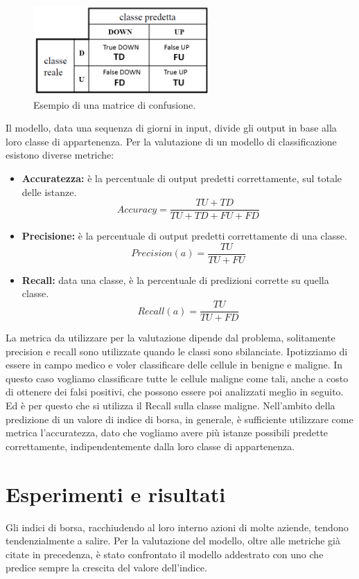 \documentclass[12pt,a4paper,twoside,openright]{book}
\begin{document}
\begin{figure}[H]
\centering
\includegraphics[width=0.6\textwidth]{images/cm2.png}
\caption{Esempio di una matrice di confusione.}
\label{fig:rapp_file}
\end{figure}

Il modello, data una sequenza di giorni in input, divide gli output in base alla loro classe di appartenenza. Per la valutazione di un modello di classificazione esistono diverse metriche:

\begin{itemize}
    \item \textbf{Accuratezza:} è la percentuale di output predetti correttamente, sul totale delle istanze.
	\[Accuracy = \frac{TU+TD}{TU+TD+FU+FD}\]
    \item \textbf{Precisione:}  è la percentuale di output predetti correttamente di una classe.
    \[Precision(a) = \frac{TU}{TU+FU}\]
    \item \textbf{Recall:} data una classe, è la percentuale di predizioni corrette su quella classe.
    \[Recall(a) = \frac{TU}{TU+FD}\]
\end{itemize}

La metrica da utilizzare per la valutazione dipende dal problema, solitamente precision e recall sono utilizzate quando le classi sono sbilanciate. Ipotizziamo di essere in campo medico e voler classificare delle cellule in benigne e maligne. In questo caso vogliamo classificare tutte le cellule maligne come tali, anche a costo di ottenere dei falsi positivi, che possono essere poi analizzati meglio in seguito. Ed è per questo che si utilizza il Recall sulla classe maligne.
Nell’ambito della predizione di un valore di indice di borsa, in generale, è sufficiente utilizzare come metrica l’accuratezza, dato che vogliamo avere più istanze possibili predette correttamente, indipendentemente dalla loro classe di appartenenza.

\section{Esperimenti e risultati}
Gli indici di borsa, racchiudendo al loro interno azioni di molte aziende, tendono tendenzialmente a salire.
Per la valutazione del modello, oltre alle metriche già citate in precedenza, è stato confrontato il modello addestrato con uno che predice sempre la crescita del valore dell'indice.
\end{document}
